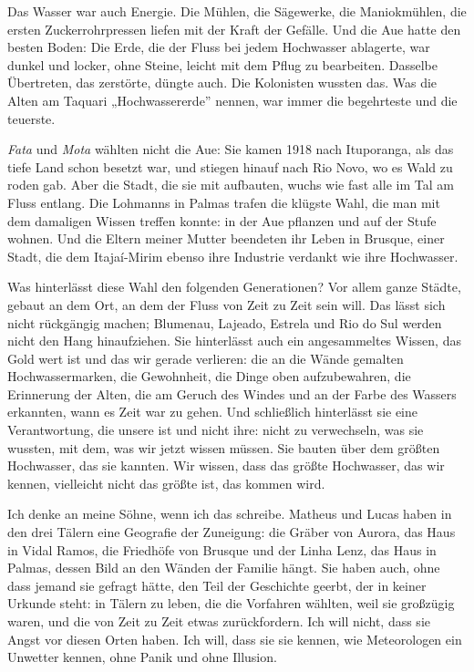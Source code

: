 \documentclass[
  ngerman,
  11pt,
  openany]{book}
\begin{document}
Das Wasser war auch Energie. Die Mühlen, die Sägewerke, die
Maniokmühlen, die ersten Zuckerrohrpressen liefen mit der Kraft der
Gefälle. Und die Aue hatte den besten Boden: Die Erde, die der Fluss bei
jedem Hochwasser ablagerte, war dunkel und locker, ohne Steine, leicht
mit dem Pflug zu bearbeiten. Dasselbe Übertreten, das zerstörte, düngte
auch. Die Kolonisten wussten das. Was die Alten am Taquari
„Hochwassererde'' nennen, war immer die begehrteste und die teuerste.

\emph{Fata} und \emph{Mota} wählten nicht die Aue: Sie kamen 1918 nach
Ituporanga, als das tiefe Land schon besetzt war, und stiegen hinauf
nach Rio Novo, wo es Wald zu roden gab. Aber die Stadt, die sie mit
aufbauten, wuchs wie fast alle im Tal am Fluss entlang. Die Lohmanns in
Palmas trafen die klügste Wahl, die man mit dem damaligen Wissen treffen
konnte: in der Aue pflanzen und auf der Stufe wohnen. Und die Eltern
meiner Mutter beendeten ihr Leben in Brusque, einer Stadt, die dem
Itajaí-Mirim ebenso ihre Industrie verdankt wie ihre Hochwasser.

Was hinterlässt diese Wahl den folgenden Generationen? Vor allem ganze
Städte, gebaut an dem Ort, an dem der Fluss von Zeit zu Zeit sein will.
Das lässt sich nicht rückgängig machen; Blumenau, Lajeado, Estrela und
Rio do Sul werden nicht den Hang hinaufziehen. Sie hinterlässt auch ein
angesammeltes Wissen, das Gold wert ist und das wir gerade verlieren:
die an die Wände gemalten Hochwassermarken, die Gewohnheit, die Dinge
oben aufzubewahren, die Erinnerung der Alten, die am Geruch des Windes
und an der Farbe des Wassers erkannten, wann es Zeit war zu gehen. Und
schließlich hinterlässt sie eine Verantwortung, die unsere ist und nicht
ihre: nicht zu verwechseln, was sie wussten, mit dem, was wir jetzt
wissen müssen. Sie bauten über dem größten Hochwasser, das sie kannten.
Wir wissen, dass das größte Hochwasser, das wir kennen, vielleicht nicht
das größte ist, das kommen wird.

Ich denke an meine Söhne, wenn ich das schreibe. Matheus und Lucas haben
in den drei Tälern eine Geografie der Zuneigung: die Gräber von Aurora,
das Haus in Vidal Ramos, die Friedhöfe von Brusque und der Linha Lenz,
das Haus in Palmas, dessen Bild an den Wänden der Familie hängt. Sie
haben auch, ohne dass jemand sie gefragt hätte, den Teil der Geschichte
geerbt, der in keiner Urkunde steht: in Tälern zu leben, die die
Vorfahren wählten, weil sie großzügig waren, und die von Zeit zu Zeit
etwas zurückfordern. Ich will nicht, dass sie Angst vor diesen Orten
haben. Ich will, dass sie sie kennen, wie Meteorologen ein Unwetter
kennen, ohne Panik und ohne Illusion.
\end{document}
